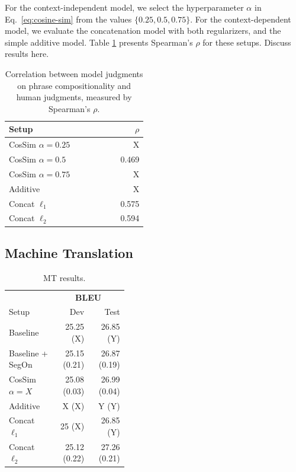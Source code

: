 \documentclass[11pt,letterpaper]{article}
\begin{document}
For the context-independent model, we select the hyperparameter $\alpha$ in Eq.~\ref{eq:cosine-sim} from the values $\{0.25, 0.5, 0.75\}$. 
For the context-dependent model, we evaluate the concatenation model with both regularizers, and the simple additive model.
Table \ref{tab:comp-results} presents Spearman's $\rho$ for these setups. 
Discuss results here. 

\begin{table}[h!]
  \begin{center}
    \begin{tabular}{p{0.5\linewidth}r}
      \hline
      Setup &  $\rho$ \\
	  \hline
      CosSim $\alpha=0.25$ & X \\
	  CosSim $\alpha=0.5$ &  0.469 \\
	  CosSim $\alpha=0.75$ & X \\
  	  Additive  &  X \\
      Concat $\ell_1$ &  0.575 \\
	  Concat $\ell_2$  & 0.594 \\
	\end{tabular}
  \end{center}
  \caption{Correlation between model judgments on phrase compositionality and human judgments, measured by Spearman's $\rho$.}
  \label{tab:comp-results}
\end{table}

\subsection{Machine Translation}
\label{sec:mt-eval}

\begin{table}[h!]
  \begin{center}
    \begin{tabular}{p{0.4\linewidth}rr}
      \hline
	  & \multicolumn{2}{c}{\bf BLEU} \\
      Setup &  Dev & Test \\
	  \hline
	  Baseline & 25.25 (X) & 26.85 (Y) \\
      Baseline + SegOn & 25.15 (0.21) & 26.87 (0.19) \\
	  CosSim $\alpha=X$ &  25.08 (0.03) & 26.99 (0.04) \\
  	  Additive  &  X (X) & Y (Y) \\
      Concat $\ell_1$ &  25 (X) & 26.85 (Y) \\
	  Concat $\ell_2$  & 25.12 (0.22) & 27.26 (0.21) \\
	\end{tabular}
  \end{center}
  \caption{MT results.}
  \label{tab:mt-results}
\end{table}
\end{document}

